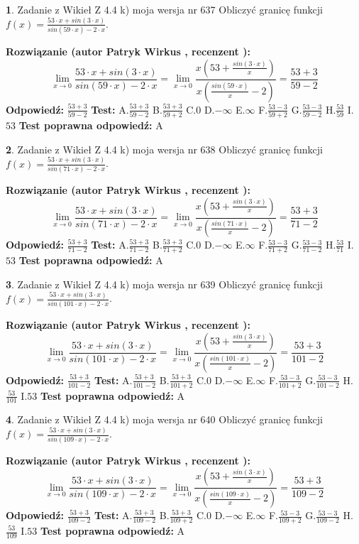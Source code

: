 \documentclass[12pt, a4paper]{article}
\theoremstyle{definition} %
\newtheorem{zad}{}
\newcommand{\zadStart}[1]{\begin{zad}#1\newline}
\newcommand{\zadStop}{\end{zad}}
\newcommand{\rozwStart}[2]{\noindent \textbf{Rozwiązanie (autor #1 , recenzent #2): }\newline}
\newcommand{\rozwStop}{\newline}
\newcommand{\odpStart}{\noindent \textbf{Odpowiedź:}\newline}
\newcommand{\odpStop}{\newline}
\newcommand{\testStart}{\noindent \textbf{Test:}\newline}
\newcommand{\testStop}{\newline}
\newcommand{\kluczStart}{\noindent \textbf{Test poprawna odpowiedź:}\newline}
\newcommand{\kluczStop}{\newline}
\begin{document}
\zadStart{Zadanie z Wikieł Z 4.4 k) moja wersja nr 637}
Obliczyć granicę funkcji $f(x)=\frac{53\cdot x +sin(3\cdot x)}{sin(59\cdot x) -2\cdot x}$.
\zadStop
\rozwStart{Patryk Wirkus}{}
$$\lim\limits_{x\to 0}\frac{53\cdot x +sin(3\cdot x)}{sin(59\cdot x) -2\cdot x}
=\lim\limits_{x\to 0}\frac{x(53+\frac{sin(3\cdot x)}{x})}{x(\frac{sin(59\cdot x)}{x}-2)}
=\frac{53+3}{59-2}$$
\rozwStop
\odpStart
$\frac{53+3}{59-2}$
\odpStop
\testStart
A.$\frac{53+3}{59-2}$
B.$\frac{53+3}{59+2}$
C.$0$
D.$-\infty$
E.$\infty$
F.$\frac{53-3}{59+2}$
G.$\frac{53-3}{59-2}$
H.$\frac{53}{59}$
I.$53$
\testStop
\kluczStart
A
\kluczStop



\zadStart{Zadanie z Wikieł Z 4.4 k) moja wersja nr 638}
Obliczyć granicę funkcji $f(x)=\frac{53\cdot x +sin(3\cdot x)}{sin(71\cdot x) -2\cdot x}$.
\zadStop
\rozwStart{Patryk Wirkus}{}
$$\lim\limits_{x\to 0}\frac{53\cdot x +sin(3\cdot x)}{sin(71\cdot x) -2\cdot x}
=\lim\limits_{x\to 0}\frac{x(53+\frac{sin(3\cdot x)}{x})}{x(\frac{sin(71\cdot x)}{x}-2)}
=\frac{53+3}{71-2}$$
\rozwStop
\odpStart
$\frac{53+3}{71-2}$
\odpStop
\testStart
A.$\frac{53+3}{71-2}$
B.$\frac{53+3}{71+2}$
C.$0$
D.$-\infty$
E.$\infty$
F.$\frac{53-3}{71+2}$
G.$\frac{53-3}{71-2}$
H.$\frac{53}{71}$
I.$53$
\testStop
\kluczStart
A
\kluczStop



\zadStart{Zadanie z Wikieł Z 4.4 k) moja wersja nr 639}
Obliczyć granicę funkcji $f(x)=\frac{53\cdot x +sin(3\cdot x)}{sin(101\cdot x) -2\cdot x}$.
\zadStop
\rozwStart{Patryk Wirkus}{}
$$\lim\limits_{x\to 0}\frac{53\cdot x +sin(3\cdot x)}{sin(101\cdot x) -2\cdot x}
=\lim\limits_{x\to 0}\frac{x(53+\frac{sin(3\cdot x)}{x})}{x(\frac{sin(101\cdot x)}{x}-2)}
=\frac{53+3}{101-2}$$
\rozwStop
\odpStart
$\frac{53+3}{101-2}$
\odpStop
\testStart
A.$\frac{53+3}{101-2}$
B.$\frac{53+3}{101+2}$
C.$0$
D.$-\infty$
E.$\infty$
F.$\frac{53-3}{101+2}$
G.$\frac{53-3}{101-2}$
H.$\frac{53}{101}$
I.$53$
\testStop
\kluczStart
A
\kluczStop



\zadStart{Zadanie z Wikieł Z 4.4 k) moja wersja nr 640}
Obliczyć granicę funkcji $f(x)=\frac{53\cdot x +sin(3\cdot x)}{sin(109\cdot x) -2\cdot x}$.
\zadStop
\rozwStart{Patryk Wirkus}{}
$$\lim\limits_{x\to 0}\frac{53\cdot x +sin(3\cdot x)}{sin(109\cdot x) -2\cdot x}
=\lim\limits_{x\to 0}\frac{x(53+\frac{sin(3\cdot x)}{x})}{x(\frac{sin(109\cdot x)}{x}-2)}
=\frac{53+3}{109-2}$$
\rozwStop
\odpStart
$\frac{53+3}{109-2}$
\odpStop
\testStart
A.$\frac{53+3}{109-2}$
B.$\frac{53+3}{109+2}$
C.$0$
D.$-\infty$
E.$\infty$
F.$\frac{53-3}{109+2}$
G.$\frac{53-3}{109-2}$
H.$\frac{53}{109}$
I.$53$
\testStop
\kluczStart
A
\kluczStop
\end{document}

